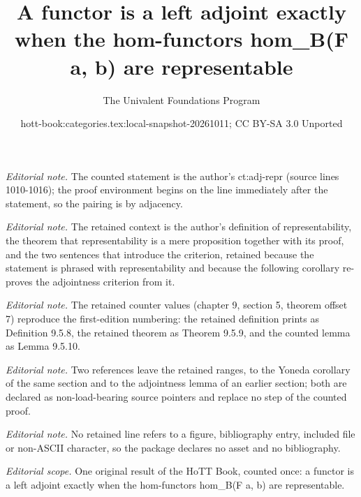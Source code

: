 \documentclass[10pt,a4paper]{article}
\title{A functor is a left adjoint exactly when the hom-functors hom\_B(F a, b) are representable}
\author{The Univalent Foundations Program}
\date{hott-book:categories.tex:local-snapshot-20261011; CC BY-SA 3.0 Unported}
\newcounter{chapter}
\theoremstyle{definition}
\theoremstyle{remark}
\numberwithin{equation}{section}
\begin{document}
\maketitle
\setcounter{chapter}{9}
\setcounter{section}{5}
\setcounter{thm}{7}
\noindent\textit{Editorial note.} The counted statement is the author's ct:adj-repr (source lines 1010-1016); the proof environment begins on the line immediately after the statement, so the pairing is by adjacency.\par\medskip
\noindent\textit{Editorial note.} The retained context is the author's definition of representability, the theorem that representability is a mere proposition together with its proof, and the two sentences that introduce the criterion, retained because the statement is phrased with representability and because the following corollary re-proves the adjointness criterion from it.\par\medskip
\noindent\textit{Editorial note.} The retained counter values (chapter 9, section 5, theorem offset 7) reproduce the first-edition numbering: the retained definition prints as Definition 9.5.8, the retained theorem as Theorem 9.5.9, and the counted lemma as Lemma 9.5.10.\par\medskip
\noindent\textit{Editorial note.} Two references leave the retained ranges, to the Yoneda corollary of the same section and to the adjointness lemma of an earlier section; both are declared as non-load-bearing source pointers and replace no step of the counted proof.\par\medskip
\noindent\textit{Editorial note.} No retained line refers to a figure, bibliography entry, included file or non-ASCII character, so the package declares no asset and no bibliography.\par\medskip
\noindent\textit{Editorial scope.} One original result of the HoTT Book, counted once: a functor is a left adjoint exactly when the hom-functors hom\_B(F a, b) are representable.\par\medskip
\end{document}

